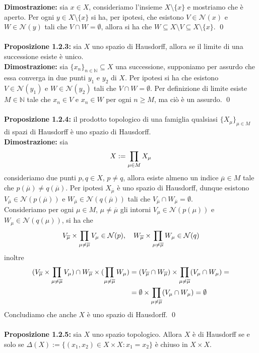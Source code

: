 \documentclass{article}
\begin{document}
\textbf{Dimostrazione:} sia $x \in X$, consideriamo l'insieme $X \setminus \{ x \}$ e mostriamo che è aperto. Per ogni $y \in X \setminus \{ x \}$ si ha, per ipotesi, che esistono $V \in \mathcal{N}(x)$ e $W \in \mathcal{N}(y)$ tali che $V \cap W = \emptyset$, allora si ha che $W \subseteq X \setminus V \subseteq X \setminus \{ x \}$. \qed \\ \\
\textbf{Proposizione 1.2.3:} sia $X$ uno spazio di Hausdorff, allora se il limite di una successione esiste è unico. \\

\textbf{Dimostrazione:} sia $\{ x_n \}_{n \in \mathbb{N}} \subseteq X$ una successione, supponiamo per assurdo che essa converga in due punti $y_1$ e $y_2$ di $X$. Per ipotesi si ha che esistono $V \in \mathcal{N}(y_1)$ e $W \in \mathcal{N}(y_2)$ tali che $V \cap W = \emptyset$. Per definizione di limite esiste $M \in \mathbb{N}$ tale che $x_n \in V$ e $x_n \in W$ per ogni $n \geq M$, ma ciò è un assurdo. \qed \\ \\
\textbf{Proposizione 1.2.4:} il prodotto topologico di una famiglia qualsiasi $\{ X_\mu \}_{\mu \in M}$ di spazi di Hausdorff è uno spazio di Hausdorff. \\

\textbf{Dimostrazione:} sia
\begin{gather}
    X := \prod_{\mu \in M} X_\mu \notag
\end{gather}
consideriamo due punti $p, q \in X$, $p \neq q$, allora esiste almeno un indice $\overline{\mu} \in M$ tale che $p(\overline{\mu}) \neq q(\overline{\mu})$. Per ipotesi $X_{\overline{\mu}}$ è uno spazio di Hausdorff, dunque esistono $V_{\overline{\mu}} \in \mathcal{N}(p(\overline{\mu}))$ e $W_{\overline{\mu}} \in \mathcal{N}(q(\overline{\mu}))$ tali che $V_{\overline{\mu}} \cap W_{\overline{\mu}} = \emptyset$. \\
Consideriamo per ogni $\mu \in M$, $\mu \neq \overline{\mu}$ gli intorni $V_\mu \in \mathcal{N}(p(\mu))$ e $W_\mu \in \mathcal{N}(q(\mu))$, si ha che
\begin{gather}
    V_{\overline{\mu}} \times \prod_{\mu \neq \overline{\mu}} V_\mu \in \mathcal{N}(p), \quad W_{\overline{\mu}} \times \prod_{\mu \neq \overline{\mu}} W_\mu \in \mathcal{N}(q) \notag
\end{gather}
inoltre
\begin{align}
    (V_{\overline{\mu}} \times \prod_{\mu \neq \overline{\mu}} V_\mu) \cap W_{\overline{\mu}} \times (\prod_{\mu \neq \overline{\mu}} W_\mu) &= (V_{\overline{\mu}} \cap W_{\overline{\mu}}) \times \prod_{\mu \neq \overline{\mu}} (V_\mu \cap W_\mu) = \notag \\
    &= \emptyset \times \prod_{\mu \neq \overline{\mu}} (V_\mu \cap W_\mu) = \emptyset \notag
\end{align}
Concludiamo che anche $X$ è uno spazio di Hausdorff. \qed \\ \\
\textbf{Proposizione 1.2.5:} sia $X$ uno spazio topologico. Allora $X$ è di Hausdorff se e solo se $\Delta(X) := \{ (x_1, x_2) \in X \times X : x_1 = x_2 \}$ è chiuso in $X \times X$. \\
\end{document}
